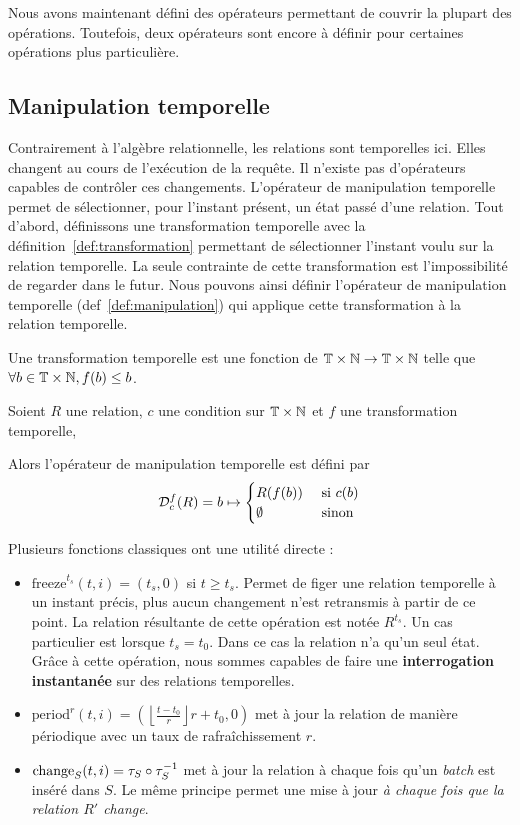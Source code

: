 Nous avons maintenant défini des opérateurs permettant de couvrir la plupart des opérations. Toutefois, deux opérateurs sont encore à définir pour certaines opérations plus particulière.
\subsection{Manipulation temporelle}\label{sec:contrib:astral:manipulation}
Contrairement à l'algèbre relationnelle, les relations sont temporelles ici. Elles changent au cours de l'exécution de la requête. Il n'existe pas d'opérateurs capables de contrôler ces changements. L'opérateur de manipulation temporelle permet de sélectionner, pour l'instant présent, un état passé d'une relation. Tout d'abord, définissons une transformation temporelle avec la définition~\ref{def:transformation} permettant de sélectionner l'instant voulu sur la relation temporelle. La seule contrainte de cette transformation est l'impossibilité de regarder dans le futur. Nous pouvons ainsi définir l'opérateur de manipulation temporelle (def~\ref{def:manipulation}) qui applique cette transformation à la relation temporelle.
\begin{defi}\label{def:transformation}
    Une transformation temporelle est une fonction de $\mathbb{T}\times\mathbb{N}\to\mathbb{T}\times\mathbb{N}$ telle que $\forall b\in\mathbb{T}\times\mathbb{N}, f(b) \leq b$.
\end{defi}

\begin{defi}\label{def:manipulation}
    Soient $R$ une relation, $c$ une condition sur $\mathbb{T}\times\mathbb{N}$ et $f$ une transformation temporelle,

    Alors l'opérateur de manipulation temporelle est défini par $$\mathcal{D}_c^f(R) = b \mapsto \begin{cases} R(f(b)) & \textrm{ si } c(b) \\ \emptyset & \textrm{ sinon}\end{cases}$$
\end{defi}

Plusieurs fonctions classiques ont une utilité directe :
\begin{itemize}
 \item $\mathrm{freeze}^{t_s}(t,i)=(t_s,0)$ si $t \geq t_s$. Permet de figer une relation temporelle à un instant précis, plus aucun changement n'est retransmis à partir de ce point. La relation résultante de cette opération est notée $R^{t_s}$. Un cas particulier est lorsque $t_s=t_0$. Dans ce cas la relation n'a qu'un seul état. Grâce à cette opération, nous sommes capables de faire une \textbf{interrogation instantanée} sur des relations temporelles.
 \item $\mathrm{period}^r(t,i)=\left(\left\lfloor\frac{t-t_0}{r}\right\rfloor r + t_0, 0\right)$ met à jour la relation de manière périodique avec un taux de rafraîchissement $r$.
 \item $\mathrm{change}_S(t,i)=\tau_S\circ\tau^{-1}_S$ met à jour la relation à chaque fois qu'un \textit{batch} est inséré dans $S$. Le même principe permet une mise à jour \textit{à chaque fois que la relation $R'$ change}.
\end{itemize}

